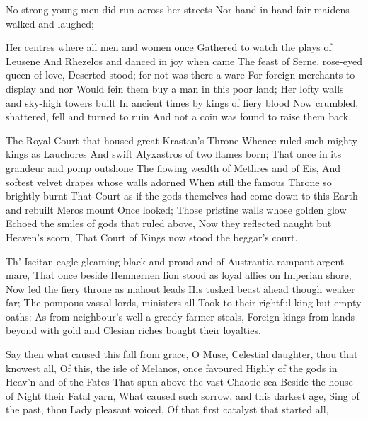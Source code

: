 \documentclass[a4paper,12pt]{article}
\newcommand{\vel}{\verseline}
\begin{document}
\begin{poem}
\begin{stanza}
No strong young men did run across her streets\vel
Nor hand-in-hand fair maidens walked and laughed;
\end{stanza}
\begin{stanza}
Her centres where all men and women once\vel
Gathered to watch the plays of Leusene\vel
And Rhezelos and danced in joy when came\vel
The feast of Serne, rose-eyed queen of love,\vel
Deserted stood; for not was there a ware\vel
For foreign merchants to display and nor\vel
Would fein them buy a man in this poor land;\vel
Her lofty walls and sky-high towers built\vel
In ancient times by kings of fiery blood\vel
Now crumbled, shattered, fell and turned to ruin\vel
And not a coin was found to raise them back.
\end{stanza}
\begin{stanza}
The Royal Court that housed great Krastan's Throne\vel
Whence ruled such mighty kings as Lauchores\vel
And swift Alyxastros of two flames born;\vel
That once in its grandeur and pomp outshone\vel
The flowing wealth of Methres and of Eis,\vel
And softest velvet drapes whose walls adorned\vel
When still the famous Throne so brightly burnt\vel
That Court as if the gods themelves had come\vel
down to this Earth and rebuilt Meros mount \vel
Once looked; Those pristine walls whose golden glow\vel
Echoed the smiles of gods that ruled above,\vel
Now they reflected naught but Heaven's scorn,\vel
That Court of Kings now stood the beggar's court.
\end{stanza}
\begin{stanza}
Th' Iseitan eagle gleaming black and proud\vel
and of Austrantia rampant argent mare,\vel
That once beside Henmernen lion stood\vel
as loyal allies on Imperian shore,\vel
Now led the fiery throne as mahout leads\vel
His tusked beast ahead though weaker far;\vel
The pompous vassal lords, ministers all\vel
Took to their rightful king but empty oaths:\vel
As from neighbour's well a greedy farmer steals,\vel
Foreign kings from lands beyond with gold\vel
and Clesian riches bought their loyalties.
\end{stanza}
\begin{stanza}
Say then what caused this fall from grace, O Muse,\vel
Celestial daughter, thou that knowest all,\vel
Of this, the isle of Melanos, once favoured\vel
Highly of the gods in Heav'n and of the Fates\vel
That spun above the vast Chaotic sea\vel
Beside the house of Night their Fatal yarn,\vel
What caused such sorrow, and this darkest age,\vel
Sing of the past, thou Lady pleasant voiced,\vel
Of that first catalyst that started all,\vel

\end{stanza}
\end{poem}
\end{document}
